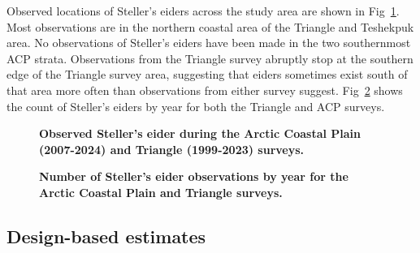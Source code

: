 \documentclass[
  10pt,
  letterpaper,
]{article}
\begin{document}
Observed locations of Steller's eiders across the study area are shown
in Fig~\ref{fig-observations}. Most observations are in the northern
coastal area of the Triangle and Teshekpuk area. No observations of
Steller's eiders have been made in the two southernmost ACP strata.
Observations from the Triangle survey abruptly stop at the southern edge
of the Triangle survey area, suggesting that eiders sometimes exist
south of that area more often than observations from either survey
suggest. Fig~\ref{fig-count} shows the count of Steller's eiders by year
for both the Triangle and ACP surveys.

\begin{figure}

\caption{\label{fig-observations}\textbf{Observed Steller's eider during the Arctic Coastal Plain (2007-2024) and Triangle (1999-2023) surveys.} }

\end{figure}%

\begin{figure}

\caption{\label{fig-count}\textbf{Number of Steller's eider observations by year for the Arctic Coastal Plain and Triangle surveys.}}

\end{figure}%

\subsection{Design-based estimates}\label{design-based-estimates-1}
\end{document}
